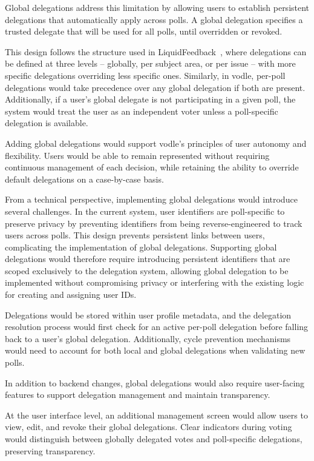 Global delegations address this limitation by allowing users to establish persistent delegations that automatically apply across polls. A global delegation specifies a trusted delegate that will be used for all polls, until overridden or revoked.

This design follows the structure used in LiquidFeedback~\citep{behrens_liquidfeedback_2014}, where delegations can be defined at three levels -- globally, per subject area, or per issue -- with more specific delegations overriding less specific ones. Similarly, in vodle, per-poll delegations would take precedence over any global delegation if both are present. Additionally, if a user's global delegate is not participating in a given poll, the system would treat the user as an independent voter unless a poll-specific delegation is available.

Adding global delegations would support vodle's principles of user autonomy and flexibility. Users would be able to remain represented without requiring continuous management of each decision, while retaining the ability to override default delegations on a case-by-case basis.

From a technical perspective, implementing global delegations would introduce several challenges. In the current system, user identifiers are poll-specific to preserve privacy by preventing identifiers from being reverse-engineered to track users across polls. This design prevents persistent links between users, complicating the implementation of global delegations. Supporting global delegations would therefore require introducing persistent identifiers that are scoped exclusively to the delegation system, allowing global delegation to be implemented without compromising privacy or interfering with the existing logic for creating and assigning user IDs. 

Delegations would be stored within user profile metadata, and the delegation resolution process would first check for an active per-poll delegation before falling back to a user's global delegation. Additionally, cycle prevention mechanisms would need to account for both local and global delegations when validating new polls.

In addition to backend changes, global delegations would also require user-facing features to support delegation management and maintain transparency.

At the user interface level, an additional management screen would allow users to view, edit, and revoke their global delegations. Clear indicators during voting would distinguish between globally delegated votes and poll-specific delegations, preserving transparency.

